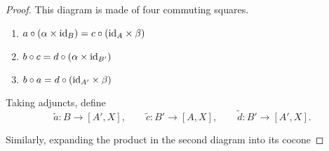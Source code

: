 \documentclass[main.tex]{subfiles}
\begin{document}
\begin{proof}
  This diagram is made of four commuting squares.
  \begin{enumerate}
    \item $a \circ (\alpha \times \mathrm{id}_{B}) = c \circ (\mathrm{id}_{A} \times \beta)$

    \item $b \circ c = d \circ (\alpha \times \mathrm{id}_{B'})$

    \item $b \circ a = d \circ (\mathrm{id}_{A'} \times \beta)$
  \end{enumerate}

  Taking adjuncts, define
  \begin{equation*}
    \tilde{a}\colon B \to [A', X],\qquad \tilde{c}\colon B' \to [A, X],\qquad \tilde{d}\colon B' \to [A', X].
  \end{equation*}

  Similarly, expanding the product in the second diagram into its cocone
\end{proof}
\end{document}

